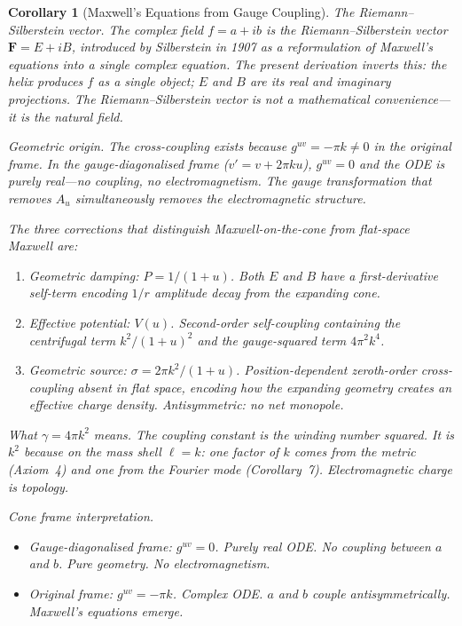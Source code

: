 \documentclass[12pt]{amsart}
\newtheorem{corollary}{Corollary}
\begin{document}
\begin{corollary}[Maxwell's Equations from Gauge Coupling]
\textit{The Riemann--Silberstein vector.} The complex field $f = a + ib$ is the
Riemann--Silberstein vector $\mathbf{F} = E + iB$, introduced by Silberstein in 1907 as a
reformulation of Maxwell's equations into a single complex equation. The present derivation
inverts this: the helix produces $f$ as a single object; $E$ and $B$ are its real and imaginary
projections. The Riemann--Silberstein vector is not a mathematical convenience---it is the
natural field.

\textit{Geometric origin.} The cross-coupling exists because $g^{uv} = -\pi k \ne 0$ in the
original frame. In the gauge-diagonalised frame ($v' = v + 2\pi k u$), $g^{uv} = 0$ and the
ODE is purely real---no coupling, no electromagnetism. The gauge transformation that removes
$A_u$ simultaneously removes the electromagnetic structure.

The three corrections that distinguish Maxwell-on-the-cone from flat-space Maxwell are:
\begin{enumerate}
\item \textit{Geometric damping:} $P = 1/(1+u)$. Both $E$ and $B$ have a first-derivative
  self-term encoding $1/r$ amplitude decay from the expanding cone.
\item \textit{Effective potential:} $V(u)$. Second-order self-coupling containing the
  centrifugal term $k^2/(1+u)^2$ and the gauge-squared term $4\pi^2 k^4$.
\item \textit{Geometric source:} $\sigma = 2\pi k^2/(1+u)$. Position-dependent zeroth-order
  cross-coupling absent in flat space, encoding how the expanding geometry creates an effective
  charge density. Antisymmetric: no net monopole.
\end{enumerate}

\textit{What $\gamma = 4\pi k^2$ means.} The coupling constant is the winding number squared.
It is $k^2$ because on the mass shell $\ell = k$: one factor of $k$ comes from the metric
(Axiom~4) and one from the Fourier mode (Corollary~7). Electromagnetic charge is topology.

\textit{Cone frame interpretation.}
\begin{itemize}
\item \textit{Gauge-diagonalised frame:} $g^{uv} = 0$. Purely real ODE. No coupling between
  $a$ and $b$. Pure geometry. No electromagnetism.
\item \textit{Original frame:} $g^{uv} = -\pi k$. Complex ODE. $a$ and $b$ couple
  antisymmetrically. Maxwell's equations emerge.
\end{itemize}


\end{corollary}
\end{document}
